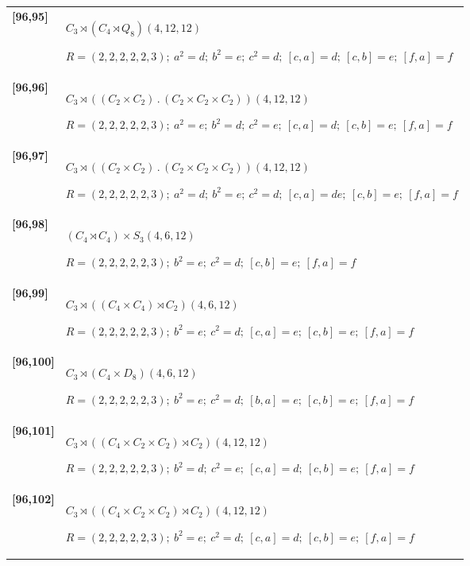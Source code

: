 \documentclass[UTF8,fontset=fandol,11pt,a4paper]{ctexart}
\begin{document}
\begin{longtable}{@{}p{17mm}>{\raggedright\arraybackslash}p{141mm}@{}}
\textbf{[96,95]} & $C_{3}\rtimes (C_{4}\rtimes Q_{8})$\quad $(4,12,12)$\par\(R=(2,2,2,2,2,3);\allowbreak\ a^{2}=d;\allowbreak\ b^{2}=e;\allowbreak\ c^{2}=d;\allowbreak\ [c,a]=d;\allowbreak\ [c,b]=e;\allowbreak\ [f,a]=f\)\\[3pt]

\textbf{[96,96]} & $C_{3}\rtimes ((C_{2}\times C_{2})\mathbin{.} (C_{2}\times C_{2}\times C_{2}))$\quad $(4,12,12)$\par\(R=(2,2,2,2,2,3);\allowbreak\ a^{2}=e;\allowbreak\ b^{2}=d;\allowbreak\ c^{2}=e;\allowbreak\ [c,a]=d;\allowbreak\ [c,b]=e;\allowbreak\ [f,a]=f\)\\[3pt]

\textbf{[96,97]} & $C_{3}\rtimes ((C_{2}\times C_{2})\mathbin{.} (C_{2}\times C_{2}\times C_{2}))$\quad $(4,12,12)$\par\(R=(2,2,2,2,2,3);\allowbreak\ a^{2}=d;\allowbreak\ b^{2}=e;\allowbreak\ c^{2}=d;\allowbreak\ [c,a]=de;\allowbreak\ [c,b]=e;\allowbreak\ [f,a]=f\)\\[3pt]

\textbf{[96,98]} & $(C_{4}\rtimes C_{4})\times S_{3}$\quad $(4,6,12)$\par\(R=(2,2,2,2,2,3);\allowbreak\ b^{2}=e;\allowbreak\ c^{2}=d;\allowbreak\ [c,b]=e;\allowbreak\ [f,a]=f\)\\[3pt]

\textbf{[96,99]} & $C_{3}\rtimes ((C_{4}\times C_{4})\rtimes C_{2})$\quad $(4,6,12)$\par\(R=(2,2,2,2,2,3);\allowbreak\ b^{2}=e;\allowbreak\ c^{2}=d;\allowbreak\ [c,a]=e;\allowbreak\ [c,b]=e;\allowbreak\ [f,a]=f\)\\[3pt]

\textbf{[96,100]} & $C_{3}\rtimes (C_{4}\times D_{8})$\quad $(4,6,12)$\par\(R=(2,2,2,2,2,3);\allowbreak\ b^{2}=e;\allowbreak\ c^{2}=d;\allowbreak\ [b,a]=e;\allowbreak\ [c,b]=e;\allowbreak\ [f,a]=f\)\\[3pt]

\textbf{[96,101]} & $C_{3}\rtimes ((C_{4}\times C_{2}\times C_{2})\rtimes C_{2})$\quad $(4,12,12)$\par\(R=(2,2,2,2,2,3);\allowbreak\ b^{2}=d;\allowbreak\ c^{2}=e;\allowbreak\ [c,a]=d;\allowbreak\ [c,b]=e;\allowbreak\ [f,a]=f\)\\[3pt]

\textbf{[96,102]} & $C_{3}\rtimes ((C_{4}\times C_{2}\times C_{2})\rtimes C_{2})$\quad $(4,12,12)$\par\(R=(2,2,2,2,2,3);\allowbreak\ b^{2}=e;\allowbreak\ c^{2}=d;\allowbreak\ [c,a]=d;\allowbreak\ [c,b]=e;\allowbreak\ [f,a]=f\)\\[3pt]


\end{longtable}
\end{document}
